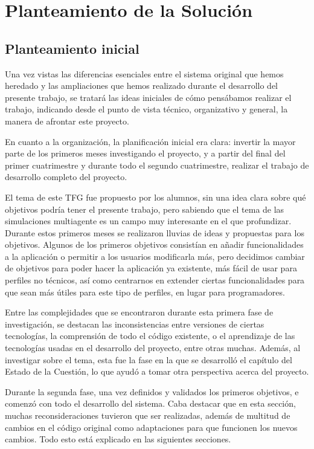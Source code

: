 \chapter{Planteamiento de la Solución}
\label{cap:planteamiento}
\section{Planteamiento inicial}

Una vez vistas las diferencias esenciales entre el sistema original que hemos heredado y las ampliaciones que hemos realizado durante el desarrollo del presente trabajo, se tratará las ideas iniciales de cómo pensábamos realizar el trabajo, indicando desde el punto de vista técnico, organizativo y general, la manera de afrontar este proyecto.

En cuanto a la organización, la planificación inicial era clara: invertir la mayor parte de los primeros meses investigando el proyecto, y a partir del final del primer cuatrimestre y durante todo el segundo cuatrimestre, realizar el trabajo de desarrollo completo del proyecto.

El tema de este TFG fue propuesto por los alumnos, sin una idea clara sobre qué objetivos podría tener el presente trabajo, pero sabiendo que el tema de las simulaciones multiagente es un campo muy interesante en el que profundizar. Durante estos primeros meses se realizaron lluvias de ideas y propuestas para los objetivos. Algunos de los primeros objetivos consistían en añadir funcionalidades a la aplicación o permitir a los usuarios modificarla más, pero decidimos cambiar de objetivos para poder hacer la aplicación ya existente, más fácil de usar para perfiles no técnicos, así como centrarnos en extender ciertas funcionalidades para que sean más útiles para este tipo de perfiles, en lugar para programadores.

Entre las complejidades que se encontraron durante esta primera fase de investigación, se destacan las inconsistencias entre versiones de ciertas tecnologías, la comprensión de todo el código existente, o el aprendizaje de las tecnologías usadas en el desarrollo del proyecto, entre otras muchas. Además, al investigar sobre el tema, esta fue la fase en la que se desarrolló el capítulo del Estado de la Cuestión, lo que ayudó a tomar otra perspectiva acerca del proyecto.

Durante la segunda fase, una vez definidos y validados los primeros objetivos, e comenzó con todo el desarrollo del sistema. Caba destacar que en esta sección, muchas reconsideraciones tuvieron que ser realizadas, además de multitud de cambios en el código original como adaptaciones para que funcionen los nuevos cambios. Todo esto está explicado en las siguientes secciones.

